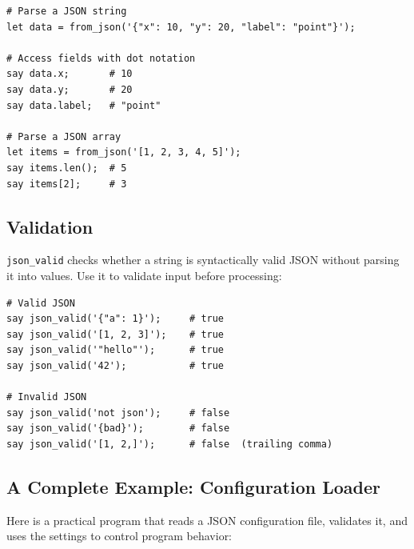 \begin{tcolorbox}[colback=codebg, colframe=darkpurple, colbacktitle=darkpurple, title=\textbf{\textcolor{codegold}{JSON Parsing}}, fonttitle=\bfseries, sharp corners]
\begin{lstlisting}
# Parse a JSON string
let data = from_json('{"x": 10, "y": 20, "label": "point"}');

# Access fields with dot notation
say data.x;       # 10
say data.y;       # 20
say data.label;   # "point"

# Parse a JSON array
let items = from_json('[1, 2, 3, 4, 5]');
say items.len();  # 5
say items[2];     # 3
\end{lstlisting}
\end{tcolorbox}

\subsection{Validation}

\texttt{json\_valid} checks whether a string is syntactically valid JSON without parsing it into values. Use it to validate input before processing:

\begin{tcolorbox}[colback=codebg, colframe=darkpurple, colbacktitle=darkpurple, title=\textbf{\textcolor{codegold}{JSON Validation}}, fonttitle=\bfseries, sharp corners]
\begin{lstlisting}
# Valid JSON
say json_valid('{"a": 1}');     # true
say json_valid('[1, 2, 3]');    # true
say json_valid('"hello"');      # true
say json_valid('42');           # true

# Invalid JSON
say json_valid('not json');     # false
say json_valid('{bad}');        # false
say json_valid('[1, 2,]');      # false  (trailing comma)
\end{lstlisting}
\end{tcolorbox}

\clearpage
\subsection{A Complete Example: Configuration Loader}

Here is a practical program that reads a JSON configuration file, validates it, and uses the settings to control program behavior:

